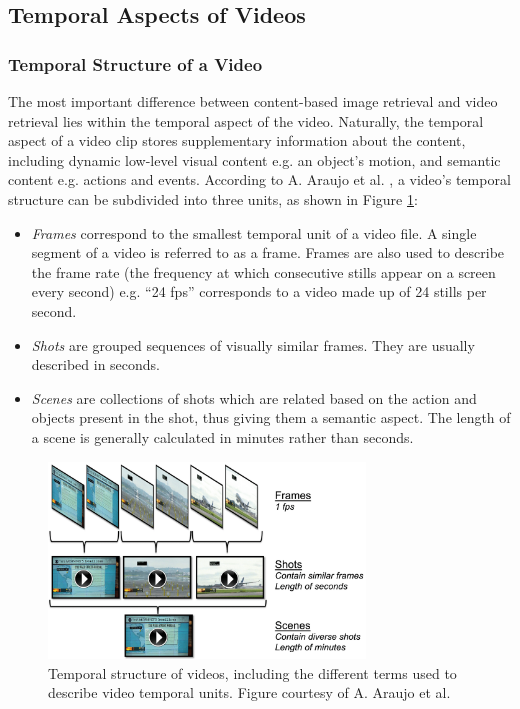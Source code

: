 
\subsection{Temporal Aspects of Videos}
\label{sec:temporal-aspect-videos}

\subsubsection{Temporal Structure of a Video}

The most important difference between content-based image retrieval and video retrieval lies within the temporal aspect of the video. Naturally, the temporal aspect of a video clip stores supplementary information about the content, including dynamic low-level visual content e.g. an object's motion, and semantic content e.g. actions and events. According to A. Araujo et al. \cite{araujo2017i2v}, a video's temporal structure can be subdivided into three units, as shown in Figure \ref{fig:temporal_structure}:
\begin{itemize}
    \item \textit{Frames} correspond to the smallest temporal unit of a video file. A single segment of a video is referred to as a frame. Frames are also used to describe the frame rate (the frequency at which consecutive stills appear on a screen every second) e.g. ``24 fps'' corresponds to a video made up of 24 stills per second.
    \item \textit{Shots} are grouped sequences of visually similar frames. They are usually described in seconds.
    \item \textit{Scenes} are collections of shots which are related based on the action and objects present in the shot, thus giving them a semantic aspect. The length of a scene is generally calculated in minutes rather than seconds.
\end{itemize}

\begin{figure}[h]
\centerline{\includegraphics[width=0.75\textwidth]{figures/temporal_structure_videos.png}}
\caption{\label{fig:temporal_structure}Temporal structure of videos, including the different terms used to describe video temporal units. Figure courtesy of A. Araujo et al.}
\end{figure}

